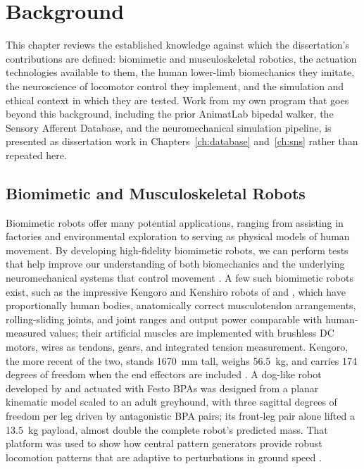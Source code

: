 \chapter{Background}\label{ch:background}
\graphicspath{{../Figures/15-background/}{figs/15-background/}}

This chapter reviews the established knowledge against which the dissertation's contributions are defined: biomimetic and musculoskeletal robotics, the actuation technologies available to them, the human lower-limb biomechanics they imitate, the neuroscience of locomotor control they implement, and the simulation and ethical context in which they are tested. Work from my own program that goes beyond this background, including the prior AnimatLab bipedal walker, the Sensory Afferent Database, and the neuromechanical simulation pipeline, is presented as dissertation work in Chapters~\ref{ch:database} and~\ref{ch:sns} rather than repeated here.

\section{Biomimetic and Musculoskeletal Robots}\label{sec:bg_robots}

Biomimetic robots offer many potential applications, ranging from assisting in factories and environmental exploration to serving as physical models of human movement. By developing high-fidelity biomimetic robots, we can perform tests that help improve our understanding of both biomechanics and the underlying neuromechanical systems that control movement \citep{shin_constructive_2018, asano_musculoskeletal_2019, ijspeert_amphibious_2020, goldsmith_investigating_2021, hunt_development_2017, schilling_adaptive_2022}. A few such biomimetic robots exist, such as the impressive Kengoro and Kenshiro robots of \citet{asano_design_2017} and \citet{asano_musculoskeletal_2019}, which have proportionally human bodies, anatomically correct musculotendon arrangements, rolling-sliding joints, and joint ranges and output power comparable with human-measured values; their artificial muscles are implemented with brushless DC motors, wires as tendons, gears, and integrated tension measurement. Kengoro, the more recent of the two, stands \qty{1670}{\mm} tall, weighs \qty{56.5}{\kg}, and carries 174 degrees of freedom when the end effectors are included \citep{asano_design_2017}. A dog-like robot developed by \citet{aschenbeck_design_2006} and actuated with Festo BPAs was designed from a planar kinematic model scaled to an adult greyhound, with three sagittal degrees of freedom per leg driven by antagonistic BPA pairs; its front-leg pair alone lifted a \qty{13.5}{\kg} payload, almost double the complete robot's predicted mass. That platform was used to show how central pattern generators provide robust locomotion patterns that are adaptive to perturbations in ground speed \citep{hunt_development_2017}.

